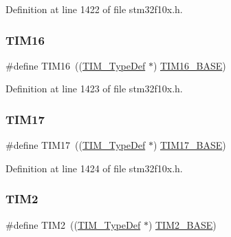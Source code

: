 Definition at line 1422 of file stm32f10x.\+h.

\mbox{\label{group___peripheral__declaration_ga73ec606e7dacf17e18c661e8ff8c7c8d}} 
\subsubsection{\texorpdfstring{T\+I\+M16}{TIM16}}
{\footnotesize\ttfamily \#define T\+I\+M16~((\hyperlink{struct_t_i_m___type_def}{T\+I\+M\+\_\+\+Type\+Def} $\ast$) \hyperlink{group___peripheral__memory__map_ga16c97093a531d763b0794c3e6d09e1bf}{T\+I\+M16\+\_\+\+B\+A\+SE})}



Definition at line 1423 of file stm32f10x.\+h.

\mbox{\label{group___peripheral__declaration_ga65aea6c8b36439e44ad6cde0e6891aab}} 
\subsubsection{\texorpdfstring{T\+I\+M17}{TIM17}}
{\footnotesize\ttfamily \#define T\+I\+M17~((\hyperlink{struct_t_i_m___type_def}{T\+I\+M\+\_\+\+Type\+Def} $\ast$) \hyperlink{group___peripheral__memory__map_gaffbedbe30e8c4cffdea326d6c1800574}{T\+I\+M17\+\_\+\+B\+A\+SE})}



Definition at line 1424 of file stm32f10x.\+h.

\mbox{\label{group___peripheral__declaration_ga3cfac9f2e43673f790f8668d48b4b92b}} 
\subsubsection{\texorpdfstring{T\+I\+M2}{TIM2}}
{\footnotesize\ttfamily \#define T\+I\+M2~((\hyperlink{struct_t_i_m___type_def}{T\+I\+M\+\_\+\+Type\+Def} $\ast$) \hyperlink{group___peripheral__memory__map_ga00d0fe6ad532ab32f0f81cafca8d3aa5}{T\+I\+M2\+\_\+\+B\+A\+SE})}



